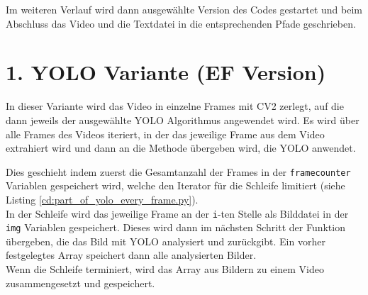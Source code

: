 {	Im weiteren Verlauf wird dann ausgewählte Version des Codes gestartet und beim Abschluss das Video und die Textdatei in die entsprechenden Pfade geschrieben.
}



\section{1. YOLO Variante (EF Version)} {
	\label{py:YOLO_every_frame}
	In dieser Variante wird das Video in einzelne Frames mit CV2 zerlegt, auf die dann jeweils der ausgewählte YOLO Algorithmus angewendet wird.
	Es wird über alle Frames des Videos iteriert, in der das jeweilige Frame aus dem Video extrahiert wird und dann an die Methode übergeben wird, die YOLO anwendet.
	
	Dies geschieht indem zuerst die Gesamtanzahl der Frames in der \lstinline|framecounter| Variablen gespeichert wird, welche den Iterator für die Schleife limitiert (siehe Listing \ref{cd:part_of_yolo_every_frame.py}). \\ 
	In der Schleife wird das jeweilige Frame an der \lstinline|i|-ten Stelle als Bilddatei in der \lstinline|img| Variablen gespeichert. Dieses wird dann im nächsten Schritt der Funktion übergeben, die das Bild mit YOLO analysiert und zurückgibt. Ein vorher festgelegtes Array speichert dann alle analysierten Bilder. \\ 
	Wenn die Schleife terminiert, wird das Array aus Bildern zu einem Video zusammengesetzt und gespeichert. \\

	
	
	
}
